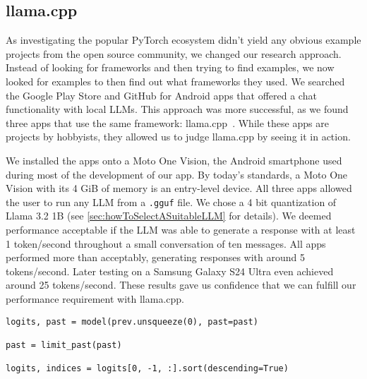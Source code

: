 \subsection{llama.cpp}
\label{sec:llamaCpp}
As investigating the popular PyTorch ecosystem didn't yield any obvious example projects from the open source community, we changed our research approach. Instead of looking for frameworks and then trying to find examples, we now looked for examples to then find out what frameworks they used. We searched the Google Play Store and GitHub for Android apps that offered a chat functionality with local \glspl{LLM}. This approach was more successful, as we found three apps that use the same framework: llama.cpp~\cite{panchalShubham0204SmolChatAndroid2025,vali-98Vali98ChatterUI2025,ghorbaniAghorbaniPocketpalai2025}. While these apps are projects by hobbyists, they allowed us to judge llama.cpp by seeing it in action.

We installed the apps onto a Moto One Vision, the Android smartphone used during most of the development of our app. By today's standards, a Moto One Vision with its 4 GiB of memory is an entry-level device. All three apps allowed the user to run any \gls{LLM} from a \lstinline|.gguf| file. We chose a 4 bit quantization of Llama 3.2 1B (see \cref{sec:howToSelectASuitableLLM} for details). We deemed performance acceptable if the \gls{LLM} was able to generate a response with at least 1 token/second throughout a small conversation of ten messages. All apps performed more than acceptably, generating responses with around 5 tokens/second. Later testing on a Samsung Galaxy S24 Ultra even achieved around 25 tokens/second. These results gave us confidence that we can fulfill our performance requirement with llama.cpp.

\vspace{0.25cm}

\begin{lstlisting}[caption={[PyTorch]{Snippet of the Stegasuras code needed to get logits from a \gls{LLM} using PyTorch~\cite{zieglerHarvardnlpNeuralSteganography2025}. Tensor operations are exposed whenever indices of an object are queried.}}, label={lst:pyTorch}]
logits, past = model(prev.unsqueeze(0), past=past)

past = limit_past(past)

logits, indices = logits[0, -1, :].sort(descending=True)
\end{lstlisting}

